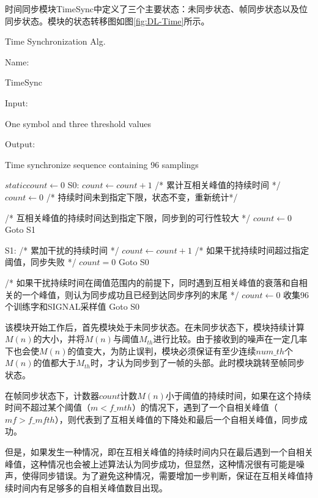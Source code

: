 \documentclass[titlepage]{article}
\numberwithin{figure}{section}
\numberwithin{equation}{section}
\begin{document}
时间同步模块TimeSync中定义了三个主要状态：未同步状态、帧同步状态以及位同步状态。模块的状态转移图如图\ref{fig:DL-Time}所示。

\begin{algorithm}[H]
\caption{Time Synchronization Alg.}
Name:

TimeSync

Input:

One symbol and three threshold values

Output:

Time synchronize sequence containing 96 samplings

\begin{algorithmic}[1]

\State $static count \gets 0$
\State S0:
\State $count \gets count + 1$ /* 累计互相关峰值的持续时间 */
\Else
\State $count \gets 0$ /* 持续时间未到指定下限，状态不变，重新统计*/
\EndIf

 /* 互相关峰值的持续时间达到指定下限，同步到的可行性较大 */
\State $count \gets 0$
\State Goto S1
\EndIf

\State S1:
 /* 累加干扰的持续时间 */
\State $count \gets count + 1$
\EndIf
{} /* 如果干扰持续时间超过指定阈值，同步失败 */
\State	$count = 0$
\State Goto S0
\EndIf
		
 /* 如果干扰持续时间在阈值范围内的前提下，同时遇到互相关峰值的衰落和自相关的一个峰值，则认为同步成功且已经到达同步序列的末尾 */
\State $count \gets 0$
\State 收集96个训练字和SIGNAL采样值
\State Goto S0
\EndIf
	
\end{algorithmic}
\end{algorithm}

该模块开始工作后，首先模块处于未同步状态。在未同步状态下，模块持续计算$M(n)$的大小，并将$M(n)$与阈值$M_{th}$进行比较。由于接收到的噪声在一定几率下也会使$M(n)$的值变大，为防止误判，模块必须保证有至少连续$num\_th$个$M(n)$的值都大于$M_{th}$时，才认为同步到了一帧的头部。此时模块跳转至帧同步状态。

在帧同步状态下，计数器$count$计数$M(n)$小于阈值的持续时间，如果在这个持续时间不超过某个阈值（$m<f\_mth$）的情况下，遇到了一个自相关峰值（$mf>f\_mfth$），则代表到了互相关峰值的下降处和最后一个自相关峰值，同步成功。

但是，如果发生一种情况，即在互相关峰值的持续时间内只在最后遇到一个自相关峰值，这种情况也会被上述算法认为同步成功，但显然，这种情况很有可能是噪声，使得同步错误。为了避免这种情况，需要增加一步判断，保证在互相关峰值持续时间内有足够多的自相关峰值数目出现。
\end{document}

